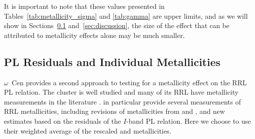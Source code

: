 \documentclass[a4paper,fleqn,usenatbib]{mnras}
\newcommand{\ocen}{$\omega$~Cen\xspace}
\begin{document}
It is important to note that these values presented in Tables~\ref{tab:metallicity_sigma} and \ref{tab:gamma} are upper limits, and as we will show in Sections~\ref{sec:residuals} and~\ref{sec:discussion}, the size of the effect that can be attributed to metallicity effects alone may be much smaller. 




\subsection{PL Residuals and Individual Metallicities}
\label{sec:residuals}

\ocen provides a second approach to testing for a metallicity effect on the RRL PL relation. The cluster is well studied and many of its RRL have metallicity measurements in the literature \citep[e.g.][]{2006ApJ...640L..43S, 2000AJ....119.1824R, 2016arXiv160904916B}. \citet{2016arXiv160904916B} in particular provide several measurements of RRL metallicities, including revisions of metallicities from \citet{2006ApJ...640L..43S} and \citet{2000AJ....119.1824R}, and new estimates based on the residuals of the $I$-band PL relation. Here we choose to use their weighted average of the rescaled \citet{2006ApJ...640L..43S} and \citet{2000AJ....119.1824R} metallicities.
\end{document}
